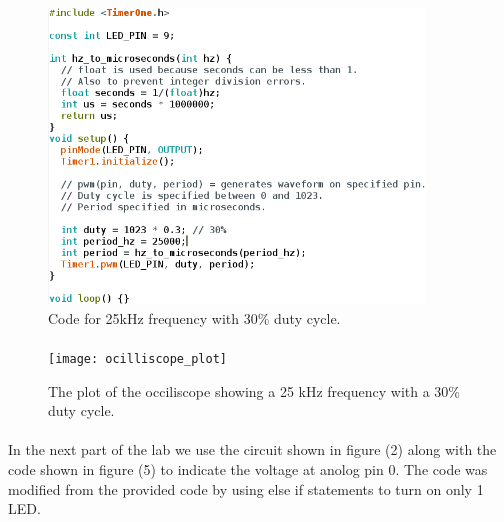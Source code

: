 \documentclass{article}
\begin{document}
\begin{figure}[H]
	\includegraphics[width=10cm]{code_part_1}
	\caption{Code for 25kHz frequency with 30\% duty cycle.}
\end{figure}

\paragraph{}
\begin{figure}[H]
	\begin{center}
	\texttt{[image: ocilliscope\_plot]}
	\end{center}
	\caption{The plot of the occiliscope showing a 25 kHz frequency with a 30\% duty cycle.}
\end{figure}

\paragraph{}
In the next part of the lab we use the circuit shown in figure (2) along with the code shown in figure (5) to indicate the voltage at anolog pin 0. The code was modified from the provided code by using else if statements to turn on only 1 LED.
\end{document}
